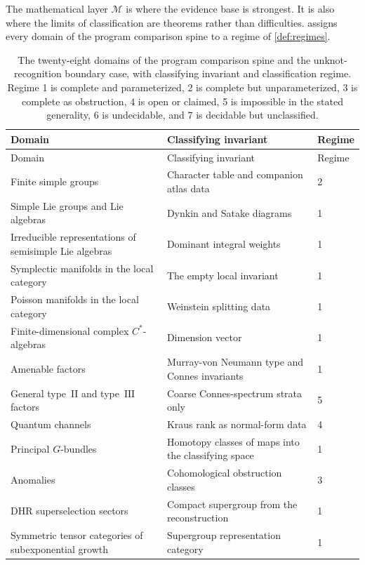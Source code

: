 \documentclass[11pt,letterpaper]{article}
\theoremstyle{definition}
\begin{document}
The mathematical layer $\mathcal{M}$ is where the evidence base is strongest. It is also where the limits of classification are theorems rather than difficulties.  assigns every domain of the program comparison spine to a regime of \cref{def:regimes}.

{\small
\begin{longtable}{L{0.32\textwidth} L{0.36\textwidth} L{0.10\textwidth}}
\caption{The twenty-eight domains of the program comparison spine and the unknot-recognition boundary case, with classifying invariant and classification regime. Regime 1 is complete and parameterized, 2 is complete but unparameterized, 3 is complete as obstruction, 4 is open or claimed, 5 is impossible in the stated generality, 6 is undecidable, and 7 is decidable but unclassified.}
\label{tab:regimes}\\
\toprule
Domain & Classifying invariant & Regime \\
\midrule
\endfirsthead
\toprule
Domain & Classifying invariant & Regime \\
\midrule
\endhead
Finite simple groups & Character table and companion atlas data & 2 \\
Simple Lie groups and Lie algebras & Dynkin and Satake diagrams & 1 \\
Irreducible representations of semisimple Lie algebras & Dominant integral weights & 1 \\
Symplectic manifolds in the local category & The empty local invariant & 1 \\
Poisson manifolds in the local category & Weinstein splitting data & 1 \\
Finite-dimensional complex $C^*$-algebras & Dimension vector & 1 \\
Amenable factors & Murray-von Neumann type and Connes invariants & 1 \\
General type~$\mathrm{II}$ and type~$\mathrm{III}$ factors & Coarse Connes-spectrum strata only & 5 \\
Quantum channels & Kraus rank as normal-form data & 4 \\
Principal $G$-bundles & Homotopy classes of maps into the classifying space & 1 \\
Anomalies & Cohomological obstruction classes & 3 \\
DHR superselection sectors & Compact supergroup from the reconstruction & 1 \\
Symmetric tensor categories of subexponential growth & Supergroup representation category & 1 \\

\end{longtable}}
\end{document}
